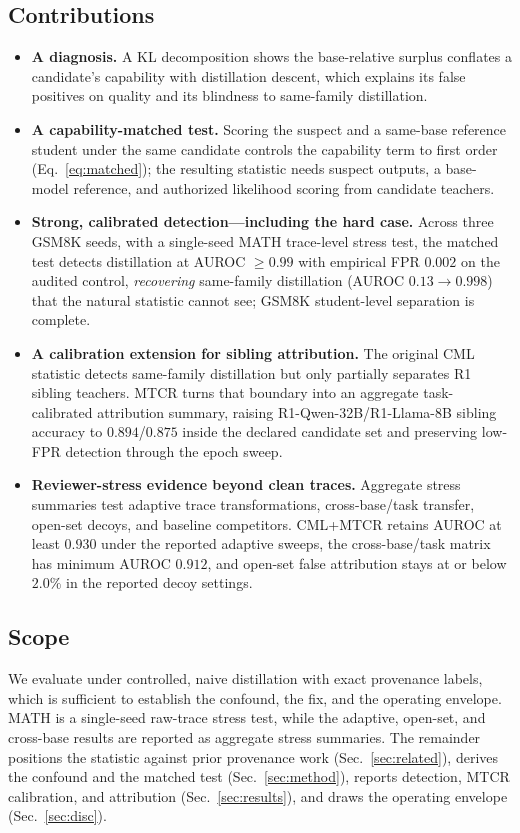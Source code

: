 \subsection{Contributions}
\begin{itemize}
  \item \textbf{A diagnosis.} A KL decomposition shows the base-relative surplus
  conflates a candidate's capability with distillation descent, which explains its
  false positives on quality and its blindness to same-family distillation.
  \item \textbf{A capability-matched test.} Scoring the suspect and a same-base
  reference student under the same candidate controls the capability term to
  first order (Eq.~\eqref{eq:matched}); the resulting statistic needs suspect outputs, a
  base-model reference, and authorized likelihood scoring from candidate teachers.
  \item \textbf{Strong, calibrated detection---including the hard case.} Across three
  GSM8K seeds, with a single-seed MATH trace-level stress test, the matched test detects distillation at AUROC $\geq0.99$
  with empirical FPR $0.002$ on the audited control, \emph{recovering} same-family distillation (AUROC $0.13\!\to\!0.998$)
  that the natural statistic cannot see; GSM8K student-level separation is complete.
  \item \textbf{A calibration extension for sibling attribution.} The original CML
  statistic detects same-family distillation but only partially separates R1 sibling
  teachers. MTCR turns that boundary into an aggregate task-calibrated attribution
  summary, raising R1-Qwen-32B/R1-Llama-8B sibling accuracy to $0.894$/$0.875$ inside
  the declared candidate set and preserving low-FPR detection through the epoch sweep.
  \item \textbf{Reviewer-stress evidence beyond clean traces.} Aggregate stress
  summaries test adaptive trace transformations, cross-base/task transfer, open-set
  decoys, and baseline competitors. CML+MTCR retains AUROC at least $0.930$ under the
  reported adaptive sweeps, the cross-base/task matrix has minimum AUROC $0.912$, and
  open-set false attribution stays at or below $2.0\%$ in the reported decoy
  settings.
\end{itemize}

\subsection{Scope}
We evaluate under controlled, naive distillation with exact provenance labels, which
is sufficient to establish the confound, the fix, and the operating envelope. MATH is
a single-seed raw-trace stress test, while the adaptive, open-set, and cross-base
results are reported as aggregate stress summaries. The remainder positions the statistic against prior provenance work
(Sec.~\ref{sec:related}), derives the confound and the matched test
(Sec.~\ref{sec:method}), reports detection, MTCR calibration, and attribution
(Sec.~\ref{sec:results}), and draws the operating envelope (Sec.~\ref{sec:disc}).

